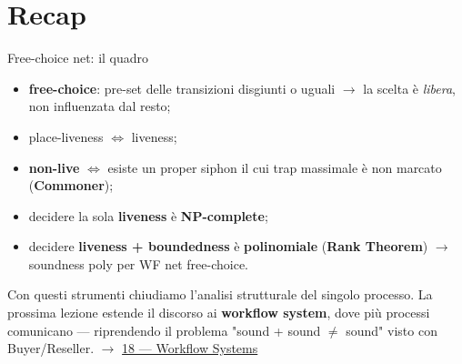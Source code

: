 \section{\texorpdfstring{Recap}{Recap}}

\begin{boxabstract}{Free-choice net: il quadro}
\begin{itemize}
\item \textbf{free-choice}: pre-set delle transizioni disgiunti o uguali $\rightarrow$ la scelta è \emph{libera}, non influenzata dal resto;
\item place-liveness $\iff$ liveness;
\item \textbf{non-live} $\iff$ esiste un proper siphon il cui trap massimale è non marcato (\textbf{Commoner});
\item decidere la sola \textbf{liveness} è \textbf{NP-complete};
\item decidere \textbf{liveness + boundedness} è \textbf{polinomiale} (\textbf{Rank Theorem}) $\rightarrow$ soundness poly per WF net free-choice.
\end{itemize}
\end{boxabstract}

Con questi strumenti chiudiamo l'analisi strutturale del singolo processo. La prossima lezione estende il discorso ai \textbf{workflow system}, dove più processi comunicano — riprendendo il problema "sound + sound $\neq$ sound" visto con Buyer/Reseller. $\rightarrow$ \hyperref[ch:18]{18 — Workflow Systems}
